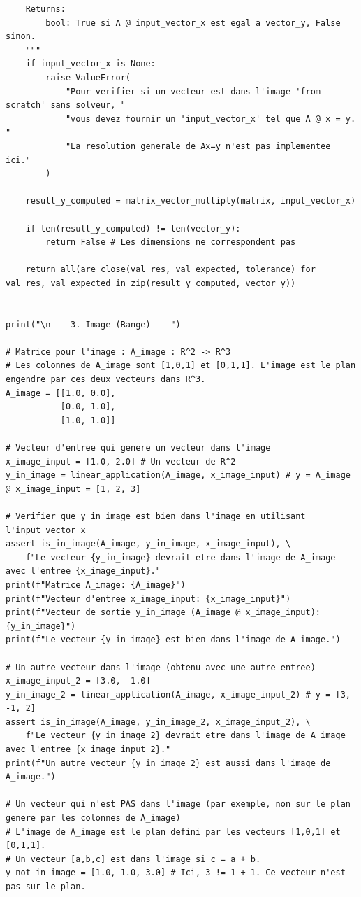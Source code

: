 \documentclass{report}
\begin{document}
\begin{verbatim}
    Returns:
        bool: True si A @ input_vector_x est egal a vector_y, False sinon.
    """
    if input_vector_x is None:
        raise ValueError(
            "Pour verifier si un vecteur est dans l'image 'from scratch' sans solveur, "
            "vous devez fournir un 'input_vector_x' tel que A @ x = y. "
            "La resolution generale de Ax=y n'est pas implementee ici."
        )

    result_y_computed = matrix_vector_multiply(matrix, input_vector_x)

    if len(result_y_computed) != len(vector_y):
        return False # Les dimensions ne correspondent pas

    return all(are_close(val_res, val_expected, tolerance) for val_res, val_expected in zip(result_y_computed, vector_y))


print("\n--- 3. Image (Range) ---")

# Matrice pour l'image : A_image : R^2 -> R^3
# Les colonnes de A_image sont [1,0,1] et [0,1,1]. L'image est le plan engendre par ces deux vecteurs dans R^3.
A_image = [[1.0, 0.0],
           [0.0, 1.0],
           [1.0, 1.0]]

# Vecteur d'entree qui genere un vecteur dans l'image
x_image_input = [1.0, 2.0] # Un vecteur de R^2
y_in_image = linear_application(A_image, x_image_input) # y = A_image @ x_image_input = [1, 2, 3]

# Verifier que y_in_image est bien dans l'image en utilisant l'input_vector_x
assert is_in_image(A_image, y_in_image, x_image_input), \
    f"Le vecteur {y_in_image} devrait etre dans l'image de A_image avec l'entree {x_image_input}."
print(f"Matrice A_image: {A_image}")
print(f"Vecteur d'entree x_image_input: {x_image_input}")
print(f"Vecteur de sortie y_in_image (A_image @ x_image_input): {y_in_image}")
print(f"Le vecteur {y_in_image} est bien dans l'image de A_image.")

# Un autre vecteur dans l'image (obtenu avec une autre entree)
x_image_input_2 = [3.0, -1.0]
y_in_image_2 = linear_application(A_image, x_image_input_2) # y = [3, -1, 2]
assert is_in_image(A_image, y_in_image_2, x_image_input_2), \
    f"Le vecteur {y_in_image_2} devrait etre dans l'image de A_image avec l'entree {x_image_input_2}."
print(f"Un autre vecteur {y_in_image_2} est aussi dans l'image de A_image.")

# Un vecteur qui n'est PAS dans l'image (par exemple, non sur le plan genere par les colonnes de A_image)
# L'image de A_image est le plan defini par les vecteurs [1,0,1] et [0,1,1].
# Un vecteur [a,b,c] est dans l'image si c = a + b.
y_not_in_image = [1.0, 1.0, 3.0] # Ici, 3 != 1 + 1. Ce vecteur n'est pas sur le plan.


\end{verbatim}
\end{document}
